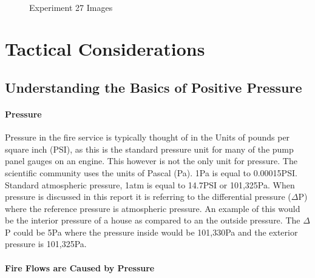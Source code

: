 \documentclass{article}
\begin{document}
\begin{figure}[H]
	\ContinuedFloat 
	\centering 
	 \ 
	\caption{Experiment 27 Images}
	\label{fig:Experiment31ImagesCont4} 
\end{figure}

\section{Tactical Considerations}

\subsection{Understanding the Basics of Positive Pressure}

\paragraph{Pressure} \mbox{}

Pressure in the fire service is typically thought of in the Units of pounds per square inch (PSI), as this is the standard pressure unit for many of the pump panel gauges on an engine. This however is not the only unit for pressure. The scientific community uses the units of Pascal (Pa).  1Pa is equal to 0.00015PSI. Standard atmospheric pressure, 1atm  is equal to 14.7PSI or 101,325Pa. When pressure is discussed in this report it is referring to the differential pressure ($\Delta$P) where the reference pressure is atmospheric pressure. An example of this would be the interior pressure of a house as compared to an the outside pressure. The $\Delta$P could be 5Pa where the pressure inside would be 101,330Pa and the exterior pressure is 101,325Pa.  

\paragraph{Fire Flows are Caused by Pressure} \mbox{}
\end{document}
